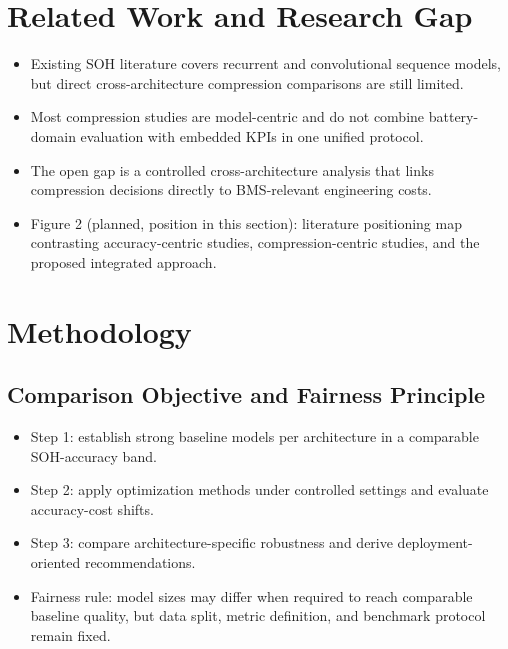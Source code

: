 ﻿\documentclass[review]{elsarticle}
\begin{document}
\section{Related Work and Research Gap}
\begin{itemize}[leftmargin=*]
\item Existing SOH literature covers recurrent and convolutional sequence models, but direct cross-architecture compression comparisons are still limited.
\item Most compression studies are model-centric and do not combine battery-domain evaluation with embedded KPIs in one unified protocol.
\item The open gap is a controlled cross-architecture analysis that links compression decisions directly to BMS-relevant engineering costs.
\item Figure 2 (planned, position in this section): literature positioning map contrasting accuracy-centric studies, compression-centric studies, and the proposed integrated approach.
\end{itemize}

\section{Methodology}
\subsection{Comparison Objective and Fairness Principle}
\begin{itemize}[leftmargin=*]
\item Step 1: establish strong baseline models per architecture in a comparable SOH-accuracy band.
\item Step 2: apply optimization methods under controlled settings and evaluate accuracy-cost shifts.
\item Step 3: compare architecture-specific robustness and derive deployment-oriented recommendations.
\item Fairness rule: model sizes may differ when required to reach comparable baseline quality, but data split, metric definition, and benchmark protocol remain fixed.
\end{itemize}
\end{document}
